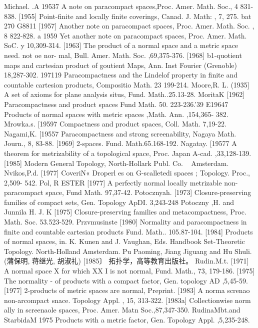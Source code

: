 \documentclass[main.tex]{subfiles}
\begin{document}
Michael. .A
{19537
	A note on paracompact spaces,Proc. Amer. Math. Soc., 4 831-838.
	[1955]
	Point-finite and locally finite coverings, Canad. J. Math: , 7, 275.
	bat 270
	G8811
	[1957]
	Another note on paracompact spaces, Proc. Amer. Math. Soc. , 8
	822-828.
	a 1959 Yet another note on paracompact spaces, Proc. Amer. Math.
	SoC. y
	10,309-314.
	[1963]
	The product of a normal space and a metric space
	need. not oe nor-
	mal, Bull. Amer. Math. Soc. ,69,375-376.
	[1968]
	b1-quotient maps and cartesian product of goutient Maps, Ann. Inst
	Fourier (Grenoble) 18,287-302.
	197119 Paracompactness and the Lindelof property in finite and countable
	cartesion products, Compositio Math. 23 199-214.
	Moore,R. L.
	(1935]
	A set of axioms for plane analysis situs, Fund. Math..25.13-28.
	MoritaK
	[1962]
	Paracompactness and product spaces Fund Math. 50. 223-236.'39
	E19647 Products of normal spaces with metric spaces ,Math. Ann. ,154,365-
	382.
	Mrowka.s.
	[19597 Compactness and product spaces, Coll. Math. 7,19-22.
	Nagami,K.
	[19557 Paracompactness and strong screenability, Nagaya Math. Journ., 8,
	83-88.
	[1969]
	2-spaces. Fund. Math.65.168-192.
	Nagatay.
	[19577 A theorem for metrizability of a topological space, Proc. Japan A-cad. ,33,128-139.
	[1985]
	Modern General Topology, North-Hollark Publ. Co.
	~ Amsterdam.
	Nvikos,P.d.
	[1977]
	CoveriN« Droperl
	es on G-scalletedi spaces ; Topology. Proc., 2,509-
	542.
	Pol, R
	ESTER
	[1977] A perfectly normal locally metrizable non-paracompact space, Fund
	Math.
	97,37-42.
	Potocznyah.
	[1973]
	Closure-preserving families of compact sets, Gen. Topology ApDI.
	3,243-248
	Potoczny ,H. and Junnila H. J. K
	[1975]%
	Closure-preserving
	families and metacompactness, Proc.
	Math. Soc.
	53.523-529.
	Przvmusinste
	[1980]
	Normality and paracompactness in finite and countable cartesian
	products Fund. Math.. 105.87-104.
	[1984]
	Products of normal spaces, in. K. Kunen and J. Vaughan, Eds.
	Handbook
	Set-Theoretic
	Topology.
	North-Holland
	Amsterdam.
	Pu Paoming, Jiang Jiguang and Hu Shuli. (蒲保明, 蒋继光, 胡淑礼)
	[1985〕 拓扑学，高等教育出版社。
	Rudin.M.t.
	[1971]
	A normal space X for which XX I is not normal, Fund. Math., 73,
	179-186.
	[1975] The normality
	- of products with a compact
	factor, Gen. topology AD
	,5,45-59.
	[1977]
	2-products of metric spaces are normal, Preprint.
[1983]
A norma screnao non-arcompact
snace. Topology
Appl. , 15,
313-322.
[1983a]
Collectionwise
norm
ally in screenaole spaces, Proc. Amer. Matn
Soc.,87,347-350.
RudinaMbt.and StarbidaM
1975 Products with a metric factor, Gen. Topology Appl. ,5,235-248.
}
\end{document}
